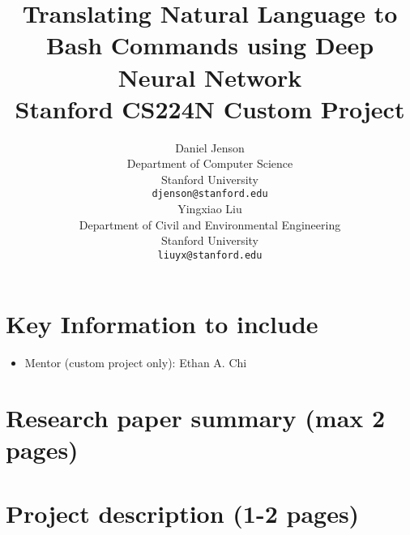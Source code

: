 \documentclass{article}
\title{
  Translating Natural Language to Bash Commands using Deep Neural Network\\
  \vspace{1em}
  \small{\normalfont Stanford CS224N Custom Project}  %
}
\author{
  Daniel Jenson \\
  Department of Computer Science \\
  Stanford University \\
  \texttt{djenson@stanford.edu} \\
  \And
  Yingxiao Liu \\
  Department of Civil and Environmental Engineering \\
  Stanford University \\
  \texttt{liuyx@stanford.edu} \\
}
\begin{document}
\maketitle



\section{Key Information to include}

\begin{itemize}
    \item Mentor (custom project only): Ethan A. Chi
\end{itemize}


\section{Research paper summary (max 2 pages)}

\section{Project description (1-2 pages)}




\end{document}
